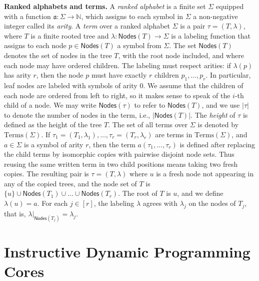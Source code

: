 \documentclass[11pt,a4paper]{article}
\newcommand{\alphabet}{\Sigma}
\newcommand{\aterm}{\tau}
\newcommand{\nodes}[1]{\mathsf{Nodes}(#1)}
\newcommand{\anode}{p}
\newcommand{\asymbol}{a}
\newcommand{\arity}{\mathfrak{a}}
\newcommand{\labelingfunction}{\lambda}
\newcommand{\atree}{T}
\newcommand{\Terms}[1]{\mathrm{Terms}(#1)}
\newcommand{\arityvalue}{r}
\begin{document}
\par\medskip\noindent\textbf{Ranked alphabets and terms.}
A \emph{ranked alphabet} is a finite set $\alphabet$ equipped with a function $\arity: \alphabet \to \mathbb{N}$, which assigns to each symbol in $\alphabet$ a non-negative integer called its \emph{arity}.
A \emph{term} over a ranked alphabet $\alphabet$ is a pair $\aterm = (\atree, \labelingfunction)$, where $\atree$ is a finite rooted tree and $\labelingfunction : \nodes{\atree} \to \alphabet$ is a labeling function that assigns to each node $\anode \in \nodes{\atree}$ a symbol from $\alphabet$. The set $\nodes{\atree}$ denotes the set of nodes in the tree $\atree$, with the root node included, and where each node may have ordered children.
The labeling must respect arities: if $\labelingfunction(\anode)$ has arity $r$, then the node $\anode$ must have exactly $r$ children $\anode_1, \dots, \anode_r$. In particular, leaf nodes are labeled with symbols of arity $0$. We assume that the children of each node are ordered from left to right, so it makes sense to speak of the $i$-th child of a node.
We may write $\nodes{\aterm}$ to refer to $\nodes{\atree}$, and we use $|\aterm|$ to denote the number of nodes in the term, i.e., $|\nodes{\atree}|$. The \emph{height} of $\aterm$ is defined as the height of the tree $\atree$. The set of all terms over $\alphabet$ is denoted by $\Terms{\alphabet}$.
If $\aterm_1 = (\atree_1, \labelingfunction_1), \dots, \aterm_{\arityvalue} = (\atree_{\arityvalue}, \labelingfunction_{\arityvalue})$ are terms in $\Terms{\alphabet}$, and $\asymbol \in \alphabet$ is a symbol of arity $\arityvalue$, then the term $\asymbol(\aterm_1, \dots, \aterm_{\arityvalue})$ is defined after replacing the child terms by isomorphic copies with pairwise disjoint node sets. Thus reusing the same written term in two child positions means taking two fresh copies. The resulting pair is $\aterm = (\atree, \labelingfunction)$ where $u$ is a fresh node not appearing in any of the copied trees, and the node set of $\atree$ is $\{u\} \cup \nodes{\atree_1} \cup \dots \cup \nodes{\atree_{\arityvalue}}$. The root of $\atree$ is $u$, and we define $\labelingfunction(u) = \asymbol$. For each $j \in [\arityvalue]$, the labeling $\labelingfunction$ agrees with $\labelingfunction_j$ on the nodes of $\atree_j$, that is, $\labelingfunction|_{\nodes{\atree_j}} = \labelingfunction_j$.

\section{Instructive Dynamic Programming Cores}
\label{section:InstructiveTreeDecompositions}
\end{document}
